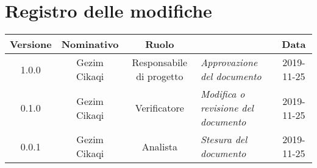 \section*{Registro delle modifiche}
\renewcommand{\arraystretch}{1.8}
  
  \begin{longtable}{|c|c|c|p{3.8cm}|c|}
    \hline
    
    \rowcolor{header}
    \textbf{Versione} & \textbf{Nominativo} & \textbf{Ruolo} & \centering{\textbf{Descrizione}} & \textbf{Data}\\
    
    \hline

	1.0.0 & Gezim Cikaqi & Responsabile di progetto & \small{\textit{Approvazione del documento}} & 2019-11-25\\
	
	\hline 
    \hline

	0.1.0 & Gezim Cikaqi & Verificatore & \small{\textit{Modifica o revisione del documento}} & 2019-11-25\\
	
	\hline 
    \hline
    
    0.0.1 & Gezim Cikaqi & Analista & \small{\textit{Stesura del documento}} & 2019-11-25\\
    
    \hline

  \end{longtable}